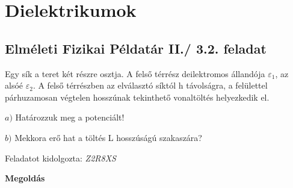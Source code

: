 \documentclass[11pt,a4paper,openany,leqno]{article}
\begin{document}
\section{Dielektrikumok}
\subsection{Elméleti Fizikai Példatár II./ 3.2. feladat}



Egy sík a teret két részre osztja. A felső térrész deilektromos állandója $\varepsilon_1$, az alsóé $\varepsilon_2$. A felső térrészben az elválasztó síktól h távolságra, a felülettel párhuzamosan végtelen hosszúnak tekinthető vonaltöltés helyezkedik el.

\medskip
$a)$ Határozzuk meg a potenciált!

\medskip
$b)$ Mekkora erő hat a töltés L hosszúságú szakaszára?

\begin{flushright} {Feladatot kidolgozta: {\it Z2R8XS}} \end{flushright}

\vspace{0.5cm}

\textbf{Megoldás}
\end{document}
